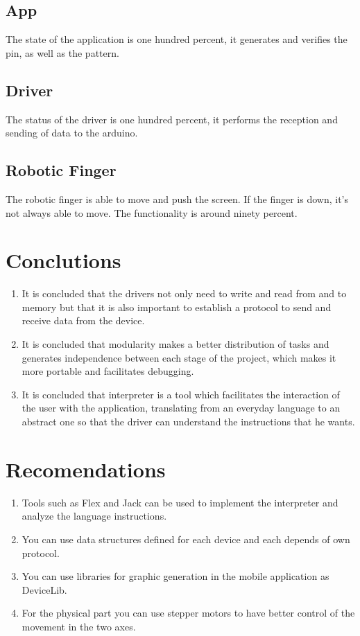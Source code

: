\documentclass[12pt,twoside]{article}
\begin{document}
\subsection*{App}
The state of the application is one hundred percent, it generates and verifies the pin, as well as the pattern.
\subsection*{Driver}
The status of the driver is one hundred percent, it performs the reception and sending of data to the arduino.
\subsection*{Robotic Finger}
The robotic finger is able to move and push the screen. If the finger is down, it's not always able to move. The functionality is around ninety percent.

\newpage

\section{Conclutions}

\begin{enumerate}
\item It is concluded that the drivers not only need to write and read from and to memory but that it is also important to establish a protocol to send and receive data from the device.

\item It is concluded that modularity makes a better distribution of tasks and generates independence between each stage of the project, which makes it more portable and facilitates debugging.

\item It is concluded that interpreter is a tool which facilitates the interaction of the user with the application, translating from an everyday language to an abstract one so that the driver can understand the instructions that he wants.



\end{enumerate}

\newpage

\section{Recomendations}

\begin{enumerate}
\item Tools such as Flex and Jack can be used to implement the interpreter and analyze the language instructions.
\item You can use data structures defined for each device and each depends of own protocol.
\item You can use libraries for graphic generation in the mobile application as DeviceLib. 
\item For the physical part you can use stepper motors to have better control of the movement in the two axes.
\end{enumerate}
\end{document}
